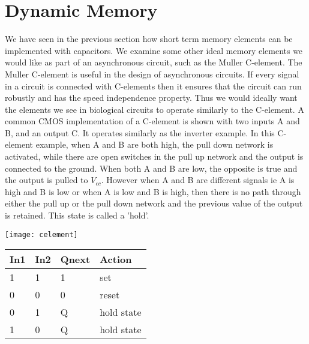 \documentclass{article}
\begin{document}
\section{Dynamic Memory}
We have seen in the previous section how short term memory elements can be implemented with capacitors.  We examine some other ideal memory elements we would like as part of an asynchronous circuit, such as the Muller C-element. 
The Muller C-element is useful in the design of asynchronous circuits.  If every signal in a circuit is connected with C-elements then it ensures that the circuit can run robustly and has the speed independence property.  Thus we would ideally want the elements we see in biological circuits to operate similarly to the C-element.  A common CMOS implementation of a C-element is shown with two inputs A and B, and an output C.  It operates similarly as the inverter example.  In this C-element example, when A and B are both high, the pull down network is activated, while there are open switches in the pull up network and the output is connected to the ground.  When both A and B are low, the opposite is true and the output is pulled to $V_{cc}$.  However when A and B are different signals ie A is high and B is low or when A is low and B is high, then there is no path through either the pull up or the pull down network and the previous value of the output is retained.  This state is called a 'hold'.
\begin{center}
\texttt{[image: celement]}
\end{center}
\begin{center}

\begin{tabular}{|p{1.5cm}|p{1.5cm}|p{1.5cm}|p{2cm}| } 
 \hline
\textbf{In1} & \textbf{In2} & \textbf{Qnext} & \textbf{Action} \\
\hline
1 & 1 & 1 & set \\
\hline
0 & 0 & 0 & reset \\ 
\hline
0 & 1 & Q & hold state \\ 
\hline
1 & 0 & Q & hold state\\ 
\hline
\end{tabular}

\end{center}
\end{document}
